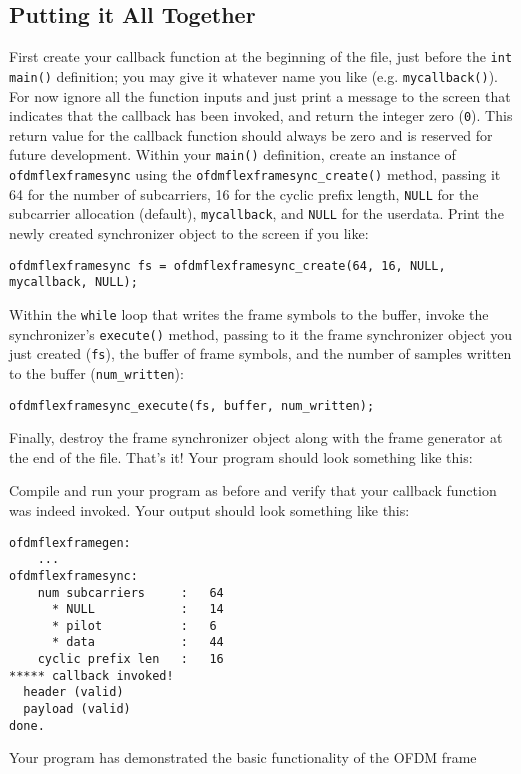 %
%
\subsection{Putting it All Together}
\label{tutorial:ofdmflexframe:xxx}
First create your callback function at the beginning of the file, just
before the {\tt int main()} definition;
you may give it whatever name you like (e.g. {\tt mycallback()}).
For now ignore all the function inputs and just print a message to the
screen that indicates that the callback has been invoked,
and return the integer zero ({\tt 0}).
This return value for the callback function should always be zero
and is reserved for future development.
Within your {\tt main()} definition, create an instance of
{\tt ofdmflexframesync} using the {\tt ofdmflexframesync\_create()}
method, passing it
  64 for the number of subcarriers,
  16 for the cyclic prefix length,
  {\tt NULL} for the subcarrier allocation (default),
  {\tt mycallback}, and
  {\tt NULL} for the userdata.
Print the newly created synchronizer object to the screen if you like:
%
\begin{Verbatim}[fontsize=\small]
    ofdmflexframesync fs = ofdmflexframesync_create(64, 16, NULL, mycallback, NULL);
\end{Verbatim}
%
Within the {\tt while} loop that writes the frame symbols to the buffer,
invoke the synchronizer's {\tt execute()} method,
passing to it the frame synchronizer object you just created ({\tt fs}),
the buffer of frame symbols,
and the number of samples written to the buffer ({\tt num\_written}):
%
\begin{Verbatim}[fontsize=\small]
    ofdmflexframesync_execute(fs, buffer, num_written);
\end{Verbatim}
%
Finally, destroy the frame synchronizer object along with the frame
generator at the end of the file.
That's it!
Your program should look something like this:
%

%
Compile and run your program as before and verify that your callback
function was indeed invoked.
Your output should look something like this:
%
\begin{Verbatim}[fontsize=\small]
ofdmflexframegen:
    ...
ofdmflexframesync:
    num subcarriers     :   64
      * NULL            :   14
      * pilot           :   6
      * data            :   44
    cyclic prefix len   :   16
***** callback invoked!
  header (valid)
  payload (valid)
done.
\end{Verbatim}
%
Your program has demonstrated the basic functionality of the OFDM frame
